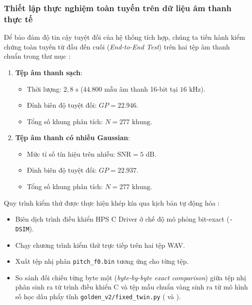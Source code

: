 \subsubsection*{Thiết lập thực nghiệm toàn tuyến trên dữ liệu âm thanh thực tế}
Để bảo đảm độ tin cậy tuyệt đối của hệ thống tích hợp, chúng ta tiến hành kiểm chứng toàn tuyến từ đầu đến cuối (\emph{End-to-End Test}) trên hai tệp âm thanh chuẩn trong thư mục :
\begin{enumerate}
    \item \textbf{Tệp âm thanh sạch}: 
    \begin{itemize}
        \item Thời lượng: $2{,}8\text{ s}$ ($44.800\text{ mẫu}$ âm thanh 16-bit tại $16\text{ kHz}$).
        \item Đỉnh biên độ tuyệt đối: $GP = 22.946$.
        \item Tổng số khung phân tích: $N = 277\text{ khung}$.
    \end{itemize}
    \item \textbf{Tệp âm thanh có nhiễu Gaussian}: 
    \begin{itemize}
        \item Mức tỉ số tín hiệu trên nhiễu: $\text{SNR} = 5\text{ dB}$.
        \item Đỉnh biên độ tuyệt đối: $GP = 22.937$.
        \item Tổng số khung phân tích: $N = 277\text{ khung}$.
    \end{itemize}
\end{enumerate}

Quy trình kiểm thử được thực hiện khép kín qua kịch bản tự động hóa :
\begin{itemize}
    \item Biên dịch trình điều khiển HPS C Driver ở chế độ mô phỏng bit-exact (\texttt{-DSIM}).
    \item Chạy chương trình kiểm thử  trực tiếp trên hai tệp WAV.
    \item Xuất tệp nhị phân \texttt{pitch\_f0.bin} tương ứng cho từng tệp.
    \item So sánh đối chiếu từng byte một (\emph{byte-by-byte exact comparison}) giữa tệp nhị phân sinh ra từ trình điều khiển C và tệp mẫu chuẩn vàng sinh ra từ mô hình số học dấu phẩy tĩnh \texttt{golden\_v2/fixed\_twin.py} ( và ).
\end{itemize}

